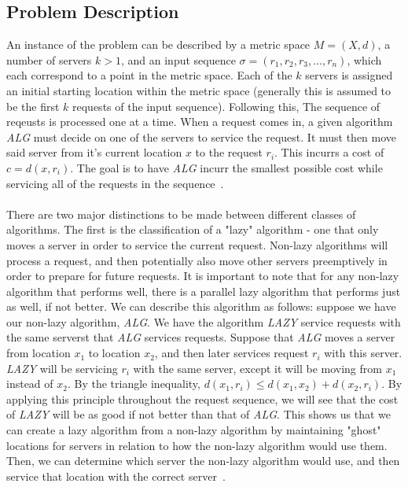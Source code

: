 \subsection{Problem Description}
\label{sec:desc}
An instance of the \KS problem can be described by a metric space $M = (X, d)$, a number of servers $k>1$, and an input sequence $\sigma = (r_1, r_2, r_3, ..., r_n)$, which each correspond to a point in the metric space. Each of the $k$ servers is assigned an initial starting location within the metric space (generally this is assumed to be the first $k$ requests of the input sequence). Following this, The sequence of reqeusts is processed one at a time. When a request comes in, a given algorithm \textit{ALG} must decide on one of the servers to service the request. It must then move said server from it's current location $x$ to the request $r_i$. This incurrs a cost of $c = d(x, r_i)$. The goal is to have \textit{ALG} incurr the smallest possible cost while servicing all of the requests in the sequence~\cite{OnlineComp1998}.
\\ \\
There are two major distinctions to be made between different classes of algorithms. The first is the classification of a "lazy" algorithm - one that only moves a server in order to service the current request. Non-lazy algorithms will process a request, and then potentially also move other servers preemptively in order to prepare for future requests. It is important to note that for any non-lazy algorithm that performs well, there is a parallel lazy algorithm that performs just as well, if not better. We can describe this algorithm as follows: suppose we have our non-lazy algorithm, \textit{ALG}. We have the algorithm \textit{LAZY} service requests with the same serverst that \textit{ALG} services requests. Suppose that \textit{ALG} moves a server from location $x_1$ to location $x_2$, and then later services request $r_i$ with this server. \textit{LAZY} will be servicing $r_i$ with the same server, except it will be moving from $x_1$ instead of $x_2$. By the triangle inequality, $d(x_1, r_i) \leq d(x_1, x_2) + d(x_2, r_i)$. By applying this principle throughout the request sequence, we will see that the cost of \textit{LAZY} will be as good if not better than that of \textit{ALG}. This shows us that we can create a lazy algorithm from a non-lazy algorithm by maintaining "ghost" locations for servers in relation to how the non-lazy algorithm would use them. Then, we can determine which server the non-lazy algorithm would use, and then service that location with the correct server~\cite{OnlineComp1998}.
